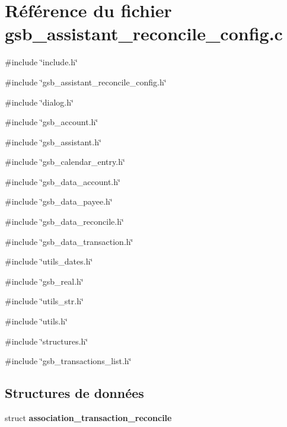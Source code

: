 \section{Référence du fichier gsb\_\-assistant\_\-reconcile\_\-config.c}
\label{gsb__assistant__reconcile__config_8c}
{\ttfamily \#include \char`\"{}include.h\char`\"{}}\par
{\ttfamily \#include \char`\"{}gsb\_\-assistant\_\-reconcile\_\-config.h\char`\"{}}\par
{\ttfamily \#include \char`\"{}dialog.h\char`\"{}}\par
{\ttfamily \#include \char`\"{}gsb\_\-account.h\char`\"{}}\par
{\ttfamily \#include \char`\"{}gsb\_\-assistant.h\char`\"{}}\par
{\ttfamily \#include \char`\"{}gsb\_\-calendar\_\-entry.h\char`\"{}}\par
{\ttfamily \#include \char`\"{}gsb\_\-data\_\-account.h\char`\"{}}\par
{\ttfamily \#include \char`\"{}gsb\_\-data\_\-payee.h\char`\"{}}\par
{\ttfamily \#include \char`\"{}gsb\_\-data\_\-reconcile.h\char`\"{}}\par
{\ttfamily \#include \char`\"{}gsb\_\-data\_\-transaction.h\char`\"{}}\par
{\ttfamily \#include \char`\"{}utils\_\-dates.h\char`\"{}}\par
{\ttfamily \#include \char`\"{}gsb\_\-real.h\char`\"{}}\par
{\ttfamily \#include \char`\"{}utils\_\-str.h\char`\"{}}\par
{\ttfamily \#include \char`\"{}utils.h\char`\"{}}\par
{\ttfamily \#include \char`\"{}structures.h\char`\"{}}\par
{\ttfamily \#include \char`\"{}gsb\_\-transactions\_\-list.h\char`\"{}}\par
\subsection*{Structures de données}
\begin{DoxyCompactItemize}
\item 
struct {\bf association\_\-transaction\_\-reconcile}
\end{DoxyCompactItemize}
